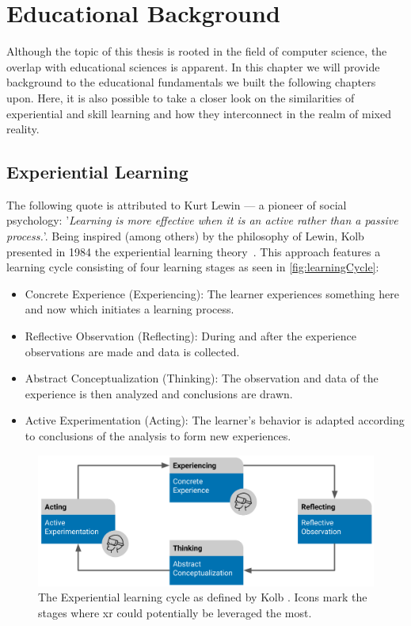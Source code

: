 %
\chapter{Educational Background \label{sec:concepts}}
Although the topic of this thesis is rooted in the field of computer science, the overlap with educational sciences is apparent. In this chapter we will provide background to the educational fundamentals we built the following chapters upon. Here, it is also possible to take a closer look on the similarities of experiential and skill learning and how they interconnect in the realm of mixed reality.


\section{Experiential Learning \label{sec:experiential}}
The following quote is attributed to Kurt Lewin --- a pioneer of social psychology: '\emph{Learning is more effective when it is an active rather than a passive process.}'. Being inspired (among others) by the philosophy of Lewin, Kolb presented in 1984 the experiential learning theory~\cite{kolb:1984:experiential}.
This approach features a learning cycle consisting of four learning stages as seen in \autoref{fig:learningCycle}:

\begin{itemize}
    \setlength{\itemsep}{-0.3cm}
    \item Concrete Experience (Experiencing): The learner experiences something here and now which initiates a learning process.
    \item Reflective Observation (Reflecting): During and after the experience observations are made and data is collected.
    \item Abstract Conceptualization (Thinking): The observation and data of the experience is then analyzed and conclusions are drawn.
    \item Active Experimentation (Acting): The learner's behavior is adapted according to conclusions of the analysis to form new experiences. 
\end{itemize}

\begin{figure}[h!bt]
	\centering
	\includegraphics[width=0.9\linewidth]{pictures/ExperientialLearningCycle2.png}
	\captionsetup{labelfont=bf,textfont=it}
	\caption[The Experiential learning cycle as defined by Kolb \cite{kolb:1984:experiential}.]{The Experiential learning cycle as defined by Kolb \cite{kolb:1984:experiential}. Icons mark the stages where \acrshort{xr} could potentially be leveraged the most.\label{fig:learningCycle}}
\end{figure}

